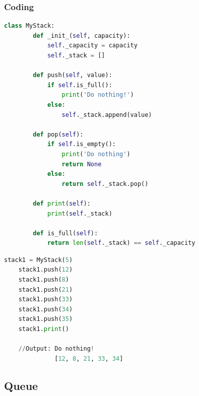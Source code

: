 \subsubsection{Coding}
\begin{lstlisting}[language=python, caption={Define Stack data structure class}]
	class MyStack:
		def _init_(self, capacity):
			self._capacity = capacity
			self._stack = []
			
		def push(self, value):
			if self.is_full():
				print('Do nothing!')
			else: 
				self._stack.append(value)
				
		def pop(self):
			if self.is_empty():
				print('Do nothing')
				return None
			else:
				return self._stack.pop()
			
		def print(self):
			print(self._stack)
			
		def is_full(self):
			return len(self._stack) == self._capacity
\end{lstlisting}

\begin{lstlisting}[language = python, caption={Push and Pop example}]
	stack1 = MyStack(5)
	stack1.push(12)
	stack1.push(8)
	stack1.push(21)
	stack1.push(33)
	stack1.push(34)
	stack1.push(35)
	stack1.print()
	
	//Output: Do nothing!
			  [12, 8, 21, 33, 34]	  
\end{lstlisting}

\subsection{Queue}
